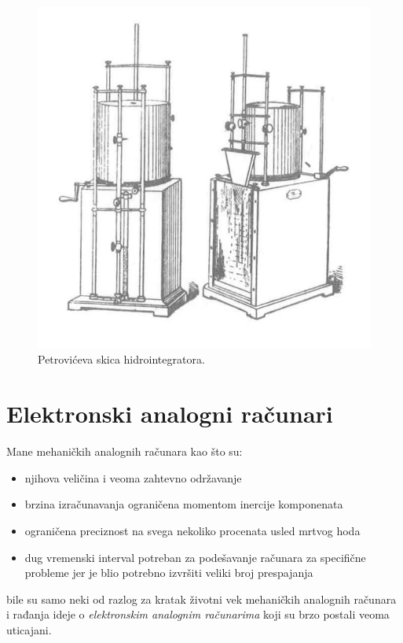 \documentclass[a4paper]{article}
\begin{document}
\bigskip

\begin{figure}[h!]
\begin{center}
\includegraphics[scale=1.5]{h1.jpg}
\end{center}
\caption{Petrovićeva skica hidrointegratora. }
\label{fig:h1}
\end{figure}
\pagebreak


\section{Elektronski analogni računari}
		\label{sec:naslov8}
		
		\bigskip
		
		\par Mane mehaničkih analognih računara kao što su:
		\begin{itemize}
			\item njihova veličina i veoma zahtevno održavanje
			\item brzina izračunavanja ograničena momentom inercije komponenata
			\item ograničena preciznost na svega nekoliko procenata usled mrtvog hoda
			\item dug vremenski interval potreban za podešavanje računara za specifične probleme jer je blio potrebno izvršiti veliki broj prespajanja
		\end{itemize}
		bile su samo neki od razlog za kratak životni vek mehaničkih analognih računara i rađanja ideje o \emph{elektronskim analognim računarima} koji su brzo postali veoma uticajani.
		
\end{document}
